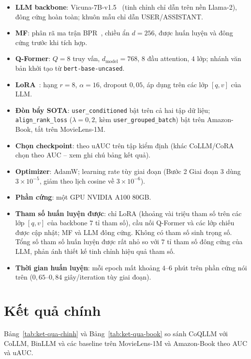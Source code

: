 \begin{itemize}
    \item \textbf{LLM backbone}: Vicuna-7B-v1.5~\cite{vicuna2023} (tinh chỉnh chỉ dẫn trên
    nền Llama-2), đông cứng hoàn toàn; khuôn mẫu chỉ dẫn USER/ASSISTANT.
    \item \textbf{MF}: phân rã ma trận BPR~\cite{bpr2009}, chiều ẩn $d = 256$, được huấn
    luyện và đông cứng trước khi tích hợp.
    \item \textbf{Q-Former}: $Q = 8$ truy vấn, $d_{\text{model}} = 768$, $8$ đầu attention,
    $4$ lớp; nhánh văn bản khởi tạo từ \texttt{bert-base-uncased}.
    \item \textbf{LoRA}~\cite{lora2021}: hạng $r = 8$, $\alpha = 16$, dropout $0{,}05$, áp
    dụng trên các lớp $[q,v]$ của LLM.
    \item \textbf{Đòn bẩy SOTA}: \texttt{user\_conditioned} bật trên cả hai tập dữ liệu;
    \texttt{align\_rank\_loss} ($\lambda = 0{,}2$, kèm \texttt{user\_grouped\_batch}) bật
    trên Amazon-Book, tắt trên MovieLens-1M.
    \item \textbf{Chọn checkpoint}: theo uAUC trên tập kiểm định (khác CoLLM/CoRA chọn theo
    AUC -- xem ghi chú bảng kết quả).
    \item \textbf{Optimizer}: AdamW; learning rate tùy giai đoạn (Bước 2 Giai đoạn 3 dùng
    $3\times10^{-5}$, giảm theo lịch cosine về $3\times10^{-6}$).
    \item \textbf{Phần cứng}: một GPU NVIDIA A100 80GB.
    \item \textbf{Tham số huấn luyện được}: chỉ LoRA (khoảng vài triệu tham số trên các lớp
    $[q,v]$ của backbone $7$ tỉ tham số), cầu nối Q-Former và các lớp chiếu được cập nhật;
    MF và LLM đông cứng. Không có tham số sinh trọng số. Tổng số tham số huấn luyện được rất
    nhỏ so với $7$ tỉ tham số đông cứng của LLM, phản ánh thiết kế tinh chỉnh hiệu quả tham số.
    \item \textbf{Thời gian huấn luyện}: mỗi epoch mất khoảng $4$--$6$ phút trên phần cứng
    nói trên ($0{,}65$--$0{,}84$ giây/iteration tùy giai đoạn).
\end{itemize}

\section{Kết quả chính}
\label{sec:ket-qua-chinh}

Bảng~\ref{tab:ket-qua-chinh} và Bảng~\ref{tab:ket-qua-book} so sánh CoQLLM với CoLLM,
BinLLM và các baseline trên MovieLens-1M và Amazon-Book theo AUC và uAUC.


